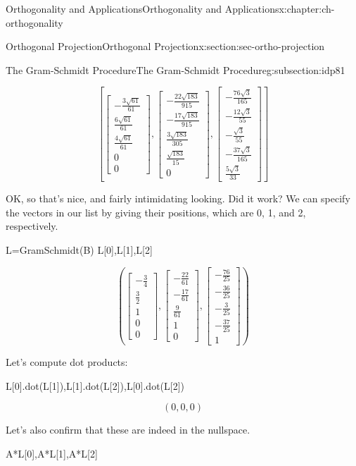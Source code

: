 \documentclass[oneside,10pt,]{book}
\numberwithin{equation}{section}
\newcommand{\bbm}{\begin{bmatrix}}
\newcommand{\ebm}{\end{bmatrix}}
\begin{document}
\begin{chapterptx}{Orthogonality and Applications}{}{Orthogonality and Applications}{}{}{x:chapter:ch-orthogonality}
\begin{sectionptx}{Orthogonal Projection}{}{Orthogonal Projection}{}{}{x:section:sec-ortho-projection}
\begin{subsectionptx}{The Gram-Schmidt Procedure}{}{The Gram-Schmidt Procedure}{}{}{g:subsection:idp81}
\begin{sageoutput}
\[\left[\bbm -\frac{3\sqrt{61}}{61}\\ \frac{6\sqrt{61}}{61}\\ \frac{4\sqrt{61}}{61}\\0\\0\ebm,
\bbm -\frac{22\sqrt{183}}{915}\\-\frac{17\sqrt{183}}{915}\\ \frac{3\sqrt{183}}{305}\\ \frac{\sqrt{183}}{15}\\0\ebm,
\bbm -\frac{76\sqrt{3}}{165}\\-\frac{12\sqrt{3}}{55}\\-\frac{\sqrt{3}}{55}\\-\frac{37\sqrt{3}}{165}\\ \frac{5\sqrt{3}}{33}\ebm\right]\]
\end{sageoutput}
OK, so that's nice, and fairly intimidating looking. Did it work? We can specify the vectors in our list by giving their positions, which are 0, 1, and 2, respectively.%
\begin{sageinput}
L=GramSchmidt(B)
L[0],L[1],L[2]
\end{sageinput}
\begin{sageoutput}
\[\left(\bbm -\frac34\\ \frac32\\1\\0\\0\ebm, \bbm -\frac{22}{61}\\-\frac{17}{61}\\ \frac{9}{61}\\1\\0\ebm, \bbm -\frac{76}{25}\\-\frac{36}{25}\\-\frac{3}{25}\\-\frac{37}{25}\\1\ebm\right)\]
\end{sageoutput}
Let's compute dot products:%
\begin{sageinput}
L[0].dot(L[1]),L[1].dot(L[2]),L[0].dot(L[2])
\end{sageinput}
\begin{sageoutput}
\[(0,0,0)\]
\end{sageoutput}
Let's also confirm that these are indeed in the nullspace.%
\begin{sageinput}
A*L[0],A*L[1],A*L[2]
\end{sageinput}
\begin{sageoutput}

\end{sageoutput}
\end{subsectionptx}
\end{sectionptx}
\end{chapterptx}
\end{document}
